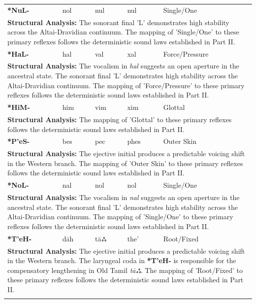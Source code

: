 \begin{longtable}{p{} p{} p{} p{} p{}}
\textbf{*NuL-} & nol & nul & nul & Single/One \\ 
\multicolumn{5}{p{\textwidth}}{\small \textbf{Structural Analysis:} The sonorant final 'L' demonstrates high stability across the Altai-Dravidian continuum. The mapping of 'Single/One' to these primary reflexes follows the deterministic sound laws established in Part II.} \\ \addlinespace[15pt] 
\textbf{*HaL-} & hal & val & xal & Force/Pressure \\ 
\multicolumn{5}{p{\textwidth}}{\small \textbf{Structural Analysis:} The vocalism in \textit{hal} suggests an open aperture in the ancestral state. The sonorant final 'L' demonstrates high stability across the Altai-Dravidian continuum. The mapping of 'Force/Pressure' to these primary reflexes follows the deterministic sound laws established in Part II.} \\ \addlinespace[15pt] 
\textbf{*HiM-} & him & vim & xim & Glottal \\ 
\multicolumn{5}{p{\textwidth}}{\small \textbf{Structural Analysis:}  The mapping of 'Glottal' to these primary reflexes follows the deterministic sound laws established in Part II.} \\ \addlinespace[15pt] 
\textbf{*P'eS-} & bes & pec & phes & Outer Skin \\ 
\multicolumn{5}{p{\textwidth}}{\small \textbf{Structural Analysis:} The ejective initial produces a predictable voicing shift in the Western branch. The mapping of 'Outer Skin' to these primary reflexes follows the deterministic sound laws established in Part II.} \\ \addlinespace[15pt] 
\textbf{*NoL-} & nal & nol & nol & Single/One \\ 
\multicolumn{5}{p{\textwidth}}{\small \textbf{Structural Analysis:} The vocalism in \textit{nal} suggests an open aperture in the ancestral state. The sonorant final 'L' demonstrates high stability across the Altai-Dravidian continuum. The mapping of 'Single/One' to these primary reflexes follows the deterministic sound laws established in Part II.} \\ \addlinespace[15pt] 
\textbf{*T'eH-} & dāh & tāஃ & the' & Root/Fixed \\ 
\multicolumn{5}{p{\textwidth}}{\small \textbf{Structural Analysis:} The ejective initial produces a predictable voicing shift in the Western branch. The laryngeal coda in \textbf{*T'eH-} is responsible for the compensatory lengthening in Old Tamil \textit{tāஃ}. The mapping of 'Root/Fixed' to these primary reflexes follows the deterministic sound laws established in Part II.} \\ \addlinespace[15pt] 

\end{longtable}
